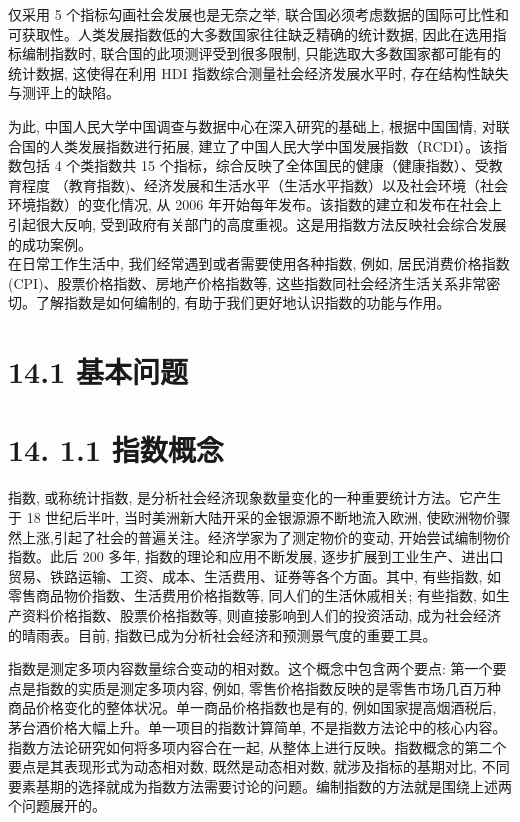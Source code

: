 \documentclass[10pt]{article}
\begin{document}
\begin{CJK*}{UTF8}{bsmi}
仅采用 5 个指标勾画社会发展也是无奈之举, 联合国必须考虑数据的国际可比性和可获取性。人类发展指数低的大多数国家往往缺乏精确的统计数据, 因此在选用指标编制指数时, 联合国的此项测评受到很多限制, 只能选取大多数国家都可能有的统计数据, 这使得在利用 HDI 指数综合测量社会经济发展水平时, 存在结构性缺失与测评上的缺陷。

为此, 中国人民大学中国调查与数据中心在深入研究的基础上, 根据中国国情, 对联合国的人类发展指数进行拓展, 建立了中国人民大学中国发展指数（RCDI）。该指数包括 4 个类指数共 15 个指标，综合反映了全体国民的健康（健康指数）、受教育程度 （教育指数)、经济发展和生活水平（生活水平指数）以及社会环境（社会环境指数）的变化情况, 从 2006 年开始每年发布。该指数的建立和发布在社会上引起很大反响, 受到政府有关部门的高度重视。这是用指数方法反映社会综合发展的成功案例。\\
在日常工作生活中, 我们经常遇到或者需要使用各种指数, 例如, 居民消费价格指数 (CPI)、股票价格指数、房地产价格指数等, 这些指数同社会经济生活关系非常密切。了解指数是如何编制的, 有助于我们更好地认识指数的功能与作用。

\section*{14.1 基本问题}
\section*{14. 1.1 指数概念}
指数, 或称统计指数, 是分析社会经济现象数量变化的一种重要统计方法。它产生于 18 世纪后半叶, 当时美洲新大陆开采的金银源源不断地流入欧洲, 使欧洲物价骤然上涨,引起了社会的普遍关注。经济学家为了测定物价的变动, 开始尝试编制物价指数。此后 200 多年, 指数的理论和应用不断发展, 逐步扩展到工业生产、进出口贸易、铁路运输、工资、成本、生活费用、证券等各个方面。其中, 有些指数, 如零售商品物价指数、生活费用价格指数等, 同人们的生活休戚相关; 有些指数, 如生产资料价格指数、股票价格指数等, 则直接影响到人们的投资活动, 成为社会经济的晴雨表。目前, 指数已成为分析社会经济和预测景气度的重要工具。

指数是测定多项内容数量综合变动的相对数。这个概念中包含两个要点: 第一个要点是指数的实质是测定多项内容, 例如, 零售价格指数反映的是零售市场几百万种商品价格变化的整体状况。单一商品价格指数也是有的, 例如国家提高烟酒税后, 茅台酒价格大幅上升。单一项目的指数计算简单, 不是指数方法论中的核心内容。指数方法论研究如何将多项内容合在一起, 从整体上进行反映。指数概念的第二个要点是其表现形式为动态相对数, 既然是动态相对数, 就涉及指标的基期对比, 不同要素基期的选择就成为指数方法需要讨论的问题。编制指数的方法就是围绕上述两个问题展开的。


\end{CJK*}
\end{document}
